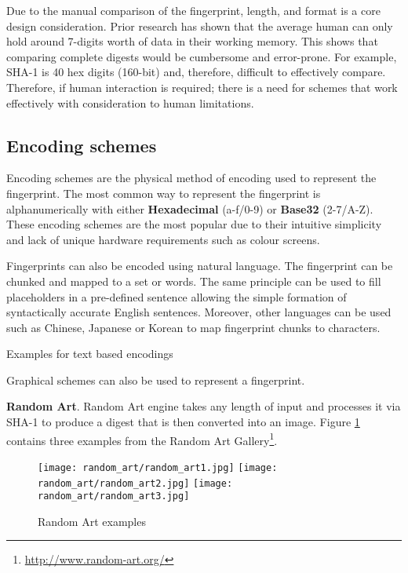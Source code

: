 Due to the manual comparison of the fingerprint, length, and format is a core design consideration. Prior research has shown that the average human can only hold around 7-digits worth of data in their working memory\cite{miller1956magical}. This shows that comparing complete digests would be cumbersome and error-prone. For example, SHA-1 is 40 hex digits (160-bit) and, therefore, difficult to effectively compare. Therefore, if human interaction is required; there is a need for schemes that work effectively with consideration to human limitations.

\newpage

\subsection{Encoding schemes}
\label{sec:encodingSchemes}
Encoding schemes are the physical method of encoding used to represent the fingerprint. The most common way to represent the fingerprint is alphanumerically with either \textbf{Hexadecimal} (a-f/0-9) or \textbf{Base32} (2-7/A-Z). These encoding schemes are the most popular due to their intuitive simplicity and lack of unique hardware requirements such as colour screens.

Fingerprints can also be encoded using natural language. The fingerprint can be chunked and mapped to a set or words. The same principle can be used to fill placeholders in a pre-defined sentence allowing the simple formation of syntactically accurate English sentences. Moreover, other languages can be used such as Chinese, Japanese or Korean to map fingerprint chunks to characters.

\begin{table}[h!]
    \centering
    
    \caption{Examples for text based encodings}
\end{table}

Graphical schemes can also be used to represent a fingerprint.

\textbf{Random Art}. Random Art engine\cite{perrig1999hash} takes any length of input and processes it via SHA-1 to produce a digest that is then converted into an image. Figure \ref{fig:randomArt} contains three examples from the Random Art Gallery\footnote{\url{http://www.random-art.org/}}.

\begin{figure}[h!]
    \centering
        \texttt{[image: random\_art/random\_art1.jpg]}
    \endminipage
        \texttt{[image: random\_art/random\_art2.jpg]}
    \endminipage
        \texttt{[image: random\_art/random\_art3.jpg]}
    \endminipage
    \caption{Random Art examples}
    \label{fig:randomArt}
\end{figure}

